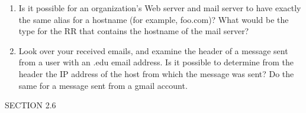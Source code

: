 \begin{enumerate}
\item Is it possible for an organization’s Web server and mail server to have exactly the same alias for a hostname (for example, foo.com)? What would be the type for the RR that contains the hostname of the mail server?



\item Look over your received emails, and examine the header of a message sent from a user with an .edu email address. Is it possible to determine from the header the IP address of the host from which the message was sent? Do the same for a message sent from a gmail account. 

\enumeratext{

}



\end{enumerate}

SECTION 2.6

